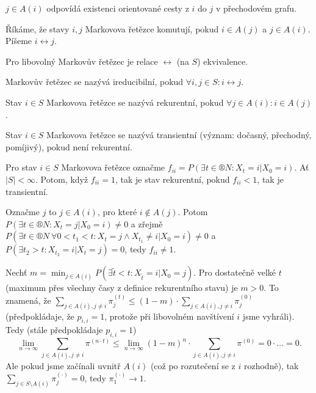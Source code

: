 \documentclass[12pt]{article}					%
\begin{document}
\begin{dusledek}
	$j \in A(i)$ odpovídá existenci orientované cesty z $i$ do $j$ v přechodovém grafu.
\end{dusledek}

\begin{definice}
	Říkáme, že stavy $i, j$ Markovova řetězce komutují, pokud $i \in A(j)$ a $j \in A(i)$. Píšeme $i \leftrightarrow j$.
\end{definice}

\begin{veta}
	Pro libovolný Markovův řetězec je relace $\leftrightarrow$ (na $S$) ekvivalence.
\end{veta}

\begin{definice}
	Markovův řetězec se nazývá ireducibilní, pokud $\forall i, j \in S: i \leftrightarrow j$.
\end{definice}

\begin{definice}
	Stav $i \in S$ Markovova řetězce se nazývá rekurentní, pokud $\forall j \in A(i): i \in A(j)$.
\end{definice}

\begin{definice}
	Stav $i \in S$ Markovova řetězce se nazývá transientní (význam: dočasný, přechodný, pomíjivý), pokud není rekurentní.
\end{definice}

\begin{veta}
	Pro stav $i \in S$ Markovova řetězce označme $f_{ii} = P(\exists t \in ®N: X_t = i | X_0 = i)$. Ať $|S| < ∞$. Potom, když $f_{ii} = 1$, tak je stav rekurentní, pokud $f_{ii} < 1$, tak je transientní.

	\begin{dukazin}[Transientní]
		Označme $j$ to $j \in A(i)$, pro které $i \notin A(j)$. Potom $P(\exists t \in ®N: X_t = j|X_0 = i) ≠ 0$ a zřejmě $P(\exists t \in ®N\ \forall 0 < t_1 < t: X_t = j \land X_{t_1} ≠ i | X_0 = i) ≠ 0$ a $P(\exists t_2 > t: X_{t_2} = i | X_t = j) = 0$, tedy $f_{ii} ≠ 1$.
	\end{dukazin}

	\begin{dukazin}
		Nechť $m = \min_{j \in A(i)} P(\exists \tilde t < t: X_{\tilde t} = i | X_0 = j)$. Pro dostatečně velké $t$ (maximum přes všechny časy z definice rekurentního stavu) je $m > 0$. To znamená, že $\sum_{j \in A(i), j ≠ i} \pi^{(t)}_j ≤ (1 - m)·\sum_{j \in A(i), j ≠ i} \pi^{(0)}_j$ (předpokládaje, že $p_{i,i} = 1$, protože při libovolném navštívení $i$ jsme vyhráli). Tedy (stále předpokládaje $p_{i, i} = 1$)
		$$ \lim_{n \rightarrow ∞} \sum_{j \in A(i), j ≠ i} \pi^{(n·t)} ≤ \lim_{n \rightarrow ∞} (1 - m)^n·\sum_{j \in A(i), j ≠ i} \pi^{(0)} = 0·… = 0. $$
		Ale pokud jsme začínali uvnitř $A(i)$ (což po rozutečení se z $i$ rozhodně), tak $\sum_{j \in S \setminus A(i)} \pi^{(·)}_j = 0$, tedy $\pi^{(·)}_1 \rightarrow 1$.
	\end{dukazin}
\end{veta}
\end{document}

